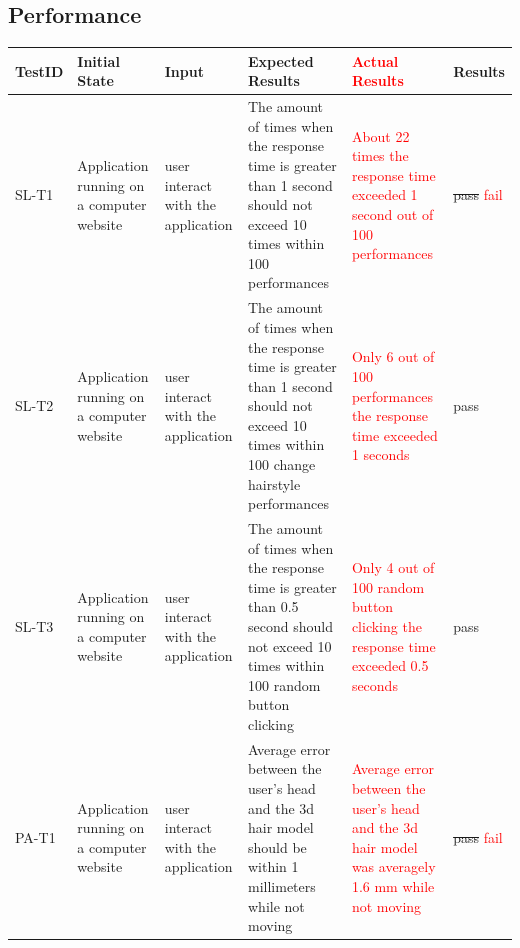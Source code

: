 \documentclass[12pt, oneside, openany, titlepage]{article}
\begin{document}
\subsection{Performance}
\begin{tabular}{ |p{1.5cm}| p{2cm} |p{2cm}| p{4cm}|p{3cm}|p{1.5cm}|  }
\hline
 TestID & Initial State & Input & Expected Results & \textcolor{red}{Actual Results}& Results\\ 
\hline
 SL-T1 & Application running on a computer website & user interact with the application & The amount of times when the response time is greater than 1 second should not exceed 10 times within 100 performances& \textcolor{red}{About 22 times the response time exceeded 1 second out of 100 performances} & \sout{pass} \textcolor{red}{fail}\\
  \hline
 SL-T2 & Application running on a computer website & user interact with the application & The amount of times when the response time is greater than 1 second should not exceed 10 times within 100 change hairstyle performances  &\textcolor{red}{Only 6 out of 100 performances the response time exceeded 1 seconds} &pass\\
 \hline
 SL-T3 & Application running on a computer website & user interact with the application & The amount of times when the response time is greater than 0.5 second should not exceed 10 times within 100 random button clicking  &\textcolor{red}{Only 4 out of 100 random button clicking the response time exceeded 0.5 seconds}& pass\\
  \hline
 PA-T1 & Application running on a computer website & user interact with the application & Average error between the user's head and the 3d hair model should be within 1 millimeters while not moving &\textcolor{red}{Average error between the user's head and the 3d hair model was averagely 1.6 mm while not moving}  & \sout{pass} \textcolor{red}{fail}\\
\hline
\end{tabular}
\end{document}
